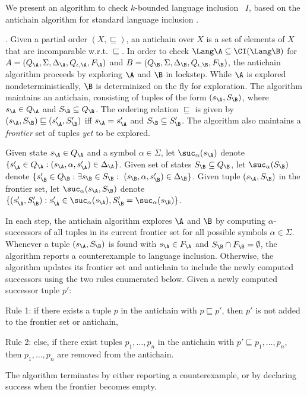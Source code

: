 We present an algorithm to check $k$-bounded language inclusion
\upto~$I$, based on the antichain algorithm for standard language
inclusion \cite{de2006antichains}. 

. 
Given a partial order $(X, \sqsubseteq)$, an antichain over $X$ is
a set of elements of $X$ that are incomparable w.r.t. $\sqsubseteq$. In order
to check $\Lang \A \subseteq \CI(\Lang \B)$ for \nfas~$A =
(Q_\A,\Sigma,\Delta_\A,Q_{\iota,\A},F_\A)$ and $B = (Q_\B,\Sigma,\Delta_\B,Q_{\iota,\B},F_\B)$,
the antichain algorithm proceeds by exploring $\A$ and $\B$ in lockstep.
While $\A$ is explored nondeterministically, $\B$ is determinized on the fly 
for exploration. The algorithm maintains
an antichain, consisting of tuples of the form $(s_\A, S_\B)$, where $s_\A \in Q_\A$ and $S_\B \subseteq Q_\B$. 
The ordering relation $\sqsubseteq$ is given by 
$(s_\A, S_\B) \sqsubseteq (s'_\A, S'_\B)$ iff $s_\A = s'_\A$ and $S_\B
\subseteq S'_\B$. The algorithm also maintains a {\em frontier} set of 
tuples {\em yet} to be explored. 

Given state $s_\A \in Q_\A$ and a symbol $\alpha \in \Sigma$,
let $\suc_\alpha(s_\A)$ denote $\{s_\A'
\in Q_\A : (s_\A,\alpha,s_\A') \in \Delta_\A\}$.  Given set of states $S_\B
\subseteq Q_\B$, let $\suc_\alpha(S_\B)$ denote $\{s_\B'\in Q_\B:
\exists s_\B \in S_\B:\ (s_\B,\alpha,s_\B')\in\Delta_\B\}$.  
Given tuple $(s_\A, S_\B)$ in the frontier set, let 
$\suc_\alpha(s_\A, S_\B)$ denote $\{(s'_\A,S'_\B): s'_\A \in
\suc_\alpha(s_\A), S'_\B = \suc_\alpha(s_\B)\}$. 

In each step, the antichain algorithm explores $\A$ and $\B$ by computing
$\alpha$-successors of all tuples in its current frontier set for all possible
symbols $\alpha \in \Sigma$. Whenever a tuple $(s_\A, S_\B)$ is found 
with $s_\A \in F_\A$ and $S_\B \cap F_\B=\emptyset$,
the algorithm reports a counterexample to language inclusion. Otherwise, the
algorithm updates its frontier set and antichain to include 
the newly computed successors using the two rules enumerated below. 
Given a newly computed successor tuple $p'$:
\begin{compactitem}
\item Rule 1: if there exists a tuple $p$ in the antichain 
with $p \sqsubseteq p'$, then $p'$ is not added to the frontier set or antichain,  
\item Rule 2: else, if there exist tuples $p_1, \ldots, p_n$ in the  antichain 
with $p' \sqsubseteq p_1, \ldots, p_n$, then $p_1, \ldots, p_n$ are removed from the antichain.
\end{compactitem}
The algorithm terminates by either reporting a counterexample, or by declaring
success when the frontier becomes empty.  

